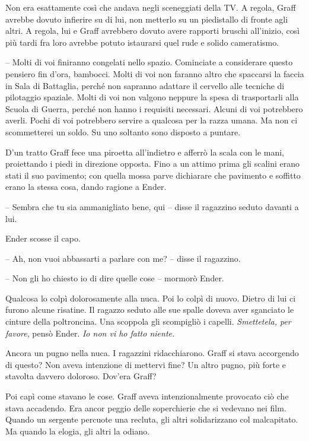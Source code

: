 {Non era esattamente così che andava negli sceneggiati della TV. A
	regola, Graff avrebbe dovuto infierire su di lui, non metterlo su un
	piedistallo di fronte agli altri. A regola, lui e Graff avrebbero dovuto
	avere rapporti bruschi all'inizio, così più tardi fra loro avrebbe
	potuto istaurarsi quel rude e solido cameratismo.}

{-- Molti di voi finiranno congelati nello spazio. Cominciate a
	considerare questo pensiero fin d'ora, bambocci. Molti di voi non
	faranno altro che spaccarsi la faccia in Sala di Battaglia, perché non
	sapranno adattare il cervello alle tecniche di pilotaggio spaziale.
	Molti di voi non valgono neppure la spesa di trasportarli alla Scuola di
	Guerra, perché non hanno i requisiti necessari. Alcuni di voi potrebbero
	averli. Pochi di voi potrebbero servire a qualcosa per la razza umana.
	Ma non ci scommetterei un soldo. Su uno soltanto sono disposto a
	puntare.}

{D'un tratto Graff fece una piroetta all'indietro e afferrò la scala con
	le mani, proiettando i piedi in direzione opposta. Fino a un attimo
	prima gli scalini erano stati il suo pavimento; con quella mossa parve
	dichiarare che pavimento e soffitto erano la stessa cosa, dando ragione
	a Ender.}

{-- Sembra che tu sia ammanigliato bene, qui -- disse il ragazzino
	seduto davanti a lui.}

{Ender scosse il capo.}

{-- Ah, non vuoi abbassarti a parlare con me? -- disse il ragazzino.}

{-- Non gli ho chiesto io di dire quelle cose -- mormorò Ender.}

{Qualcosa lo colpì dolorosamente alla nuca. Poi lo colpì di nuovo.
	Dietro di lui ci furono alcune risatine. Il ragazzo seduto alle sue
	spalle doveva aver sganciato le cinture della poltroncina. Una scoppola
	gli scompigliò i capelli. \emph{Smettetela, per favore}, \emph{} pensò
	Ender. \emph{Io non vi ho fatto niente.}}

{Ancora un pugno nella nuca. I ragazzini ridacchiarono. Graff si stava
	accorgendo di questo? Non aveva intenzione di mettervi fine? Un altro
	pugno, più forte e stavolta davvero doloroso. Dov'era Graff?}

{Poi capì come stavano le cose. Graff aveva intenzionalmente provocato
	ciò che stava accadendo. Era ancor peggio delle soperchierie che si
	vedevano nei film. Quando un sergente percuote una recluta, gli altri
	solidarizzano col malcapitato. Ma quando la elogia, gli altri la
	odiano.}

